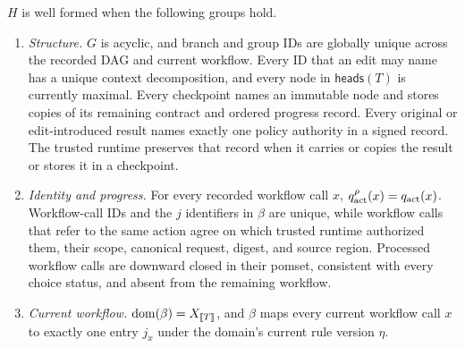 \begin{definition}
\label{def:well-formed-history}
\(H\) is well formed when the following groups hold.
\begin{enumerate}[leftmargin=*,itemsep=0pt,topsep=1pt]
\item \emph{Structure.}
\(G\) is acyclic, and branch and group IDs are globally unique across the recorded DAG and current workflow.
Every ID that an edit may name has a unique context decomposition, and every node in \(\mathsf{heads}(T)\) is currently maximal.
Every checkpoint names an immutable node and stores copies of its remaining contract and ordered progress record.
Every original or edit-introduced result names exactly one policy authority in a signed record.
The trusted runtime preserves that record when it carries or copies the result or stores it in a checkpoint.
\item \emph{Identity and progress.}
For every recorded workflow call \(x\), \(q^{\rho}_{\rm act}(x)=q_{\rm act}(x)\).
Workflow-call IDs and the \(j\) identifiers in \(\beta\) are unique, while workflow calls that refer to the same action agree on which trusted runtime authorized them, their scope, canonical request, digest, and source region.
Processed workflow calls are downward closed in their pomset, consistent with every choice status, and absent from the remaining workflow.
\item \emph{Current workflow.}
\(\operatorname{dom}(\beta)=X_{\mathopen{[\![}T\mathclose{]\!]}}\), and \(\beta\) maps every current workflow call \(x\) to exactly one entry \(j_x\) under the domain's current rule version \(\eta\).

\end{enumerate}
\end{definition}
